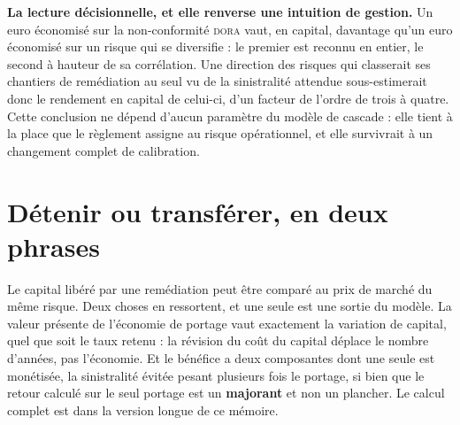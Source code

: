 \begin{cle}
\textbf{La lecture décisionnelle, et elle renverse une intuition de gestion.} Un euro économisé
sur la non-conformité \textsc{dora} vaut, en capital, davantage qu'un euro économisé sur un risque
qui se diversifie : le premier est reconnu en entier, le second à hauteur de sa corrélation. Une
direction des risques qui classerait ses chantiers de remédiation au seul vu de la sinistralité
attendue sous-estimerait donc le rendement en capital de celui-ci, d'un facteur de l'ordre de
trois à quatre. Cette conclusion ne dépend d'aucun paramètre du modèle de cascade : elle tient à
la place que le règlement assigne au risque opérationnel, et elle survivrait à un changement
complet de calibration.
\end{cle}


\section{Détenir ou transférer, en deux phrases}
\label{sec:detenir-transferer}
Le capital libéré par une remédiation peut être comparé au prix de marché du même risque.
Deux choses en ressortent, et une seule est une sortie du modèle. La valeur présente de
l'économie de portage vaut exactement la variation de capital, quel que soit le taux
retenu : la révision du coût du capital déplace le nombre d'années, pas l'économie. Et
le bénéfice a deux composantes dont une seule est monétisée, la sinistralité évitée
pesant plusieurs fois le portage, si bien que le retour calculé sur le seul portage est
un \textbf{majorant} et non un plancher. Le calcul complet est dans la version longue de ce mémoire.

